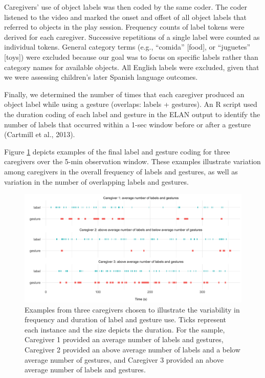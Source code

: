 \documentclass[
  english,
  man,mask]{apa6}
\begin{document}
Caregivers' use of object labels was then coded by the same coder. The coder listened to the video and marked the onset and offset of all object labels that referred to objects in the play session. Frequency counts of label tokens were derived for each caregiver. Successive repetitions of a single label were counted as individual tokens. General category terms (e.g., \enquote{comida} {[}food{]}, or \enquote{juguetes} {[}toys{]}) were excluded because our goal was to focus on specific labels rather than category names for available objects. All English labels were excluded, given that we were assessing children's later Spanish language outcomes.

Finally, we determined the number of times that each caregiver produced an object label while using a gesture (overlaps: labels + gestures). An R script used the duration coding of each label and gesture in the ELAN output to identify the number of labels that occurred within a 1-sec window before or after a gesture (Cartmill et al., 2013).

Figure \ref{fig:fig1} depicts examples of the final label and gesture coding for three caregivers over the 5-min observation window. These examples illustrate variation among caregivers in the overall frequency of labels and gestures, as well as variation in the number of overlapping labels and gestures.

\begin{figure}
\includegraphics[width=1\linewidth]{../stats/figures/fig.durations} \caption{Examples from three caregivers chosen to illustrate the variability in frequency and duration of label and gesture use.  Ticks represent each instance and the size depicts the duration. For the sample, Caregiver 1 provided an average number of labels and gestures, Caregiver 2 provided an above average number of labels and a below average number of gestures, and Caregiver 3 provided an above average number of labels and gestures.}\label{fig:fig1}
\end{figure}
\end{document}
